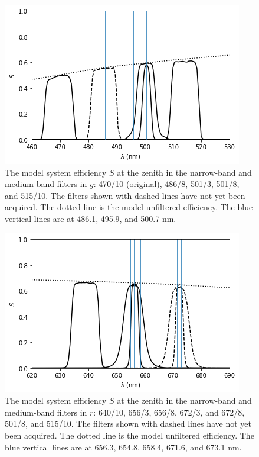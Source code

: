 \begin{figure}
\begin{center}
\includegraphics[width=0.7\linewidth]{figures/huitzi-f20-S-NBMB-g.png}
\medskip
\caption{The model system efficiency $S$ at the zenith in the narrow-band and medium-band filters in $g$: 470/10 (original), 486/8, 501/3, 501/8, and 515/10. The filters shown with dashed lines have not yet been acquired. The dotted line is the model unfiltered efficiency. The blue vertical lines are at 486.1, 495.9, and 500.7 nm.}
\end{center}
\end{figure}

\begin{figure}
\begin{center}
\includegraphics[width=0.7\linewidth]{figures/huitzi-f20-S-NBMB-r.png}
\medskip
\caption{The model system efficiency $S$ at the zenith in the narrow-band and medium-band filters in $r$: 640/10, 656/3, 656/8, 672/3, and 672/8, 501/8, and 515/10. The filters shown with dashed lines have not yet been acquired. The dotted line is the model unfiltered efficiency. The blue vertical lines are at 656.3, 654.8, 658.4, 671.6, and 673.1 nm.}
\end{center}
\end{figure}

